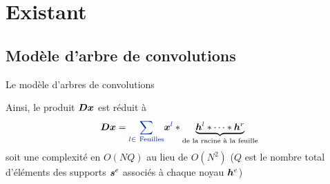 \section{Existant}


\subsection{Modèle d'arbre de convolutions}


\begin{frame}{Le modèle d'arbres de convolutions}
\begin{figure}\centering
{}
\end{figure}
Ainsi, le produit $\bm{D}\bm{x}$ est réduit à
\begin{equation} 
\D \x = \Beq{\sum_{l \in ~\text{Feuilles}}} \x^{\Beq{l}} * \underbrace{\h^{\Beq{l}}* \dots* \h^{r}}_{\textrm{de la racine à la feuille}}
\end{equation}
soit une complexité en \alert{$O(NQ)$} au lieu de $O(N^2)$ ($Q$ est le nombre total d'éléments des supports $\bm{s}^e$ associés à chaque noyau $\bm{h}^e$)
\end{frame}
 


